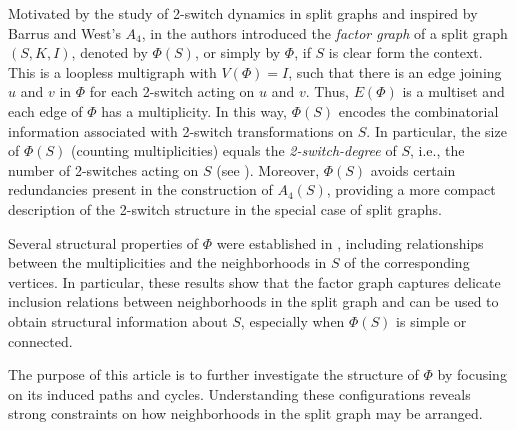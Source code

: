 \documentclass[11pt]{elsarticle}
\begin{document}
Motivated by the study of 2-switch dynamics in split graphs and inspired by Barrus and West's $A_4$, in \cite{pastine2025simple} the authors introduced the \emph{factor graph} of a split graph $(S,K,I)$, denoted by $\Phi(S)$, or simply by $\Phi$, if $S$ is clear form the context. This is a loopless multigraph with $V(\Phi)=I$, such that 
there is an edge joining $u$ and $v$ in $\Phi$ for each 2-switch acting on $u$ and $v$. Thus, $E(\Phi)$ is a multiset and each edge of $\Phi$ has a multiplicity. 
In this way, $\Phi(S)$ encodes the combinatorial information associated with 2-switch transformations on $S$. In particular, the size of $\Phi(S)$ (counting multiplicities) equals the \textit{2-switch-degree} of $S$, i.e., the number of 2-switches acting on $S$ (see \cite{pastine20252}). Moreover, $\Phi(S)$ avoids certain redundancies present in the construction of $A_4(S)$, providing a more compact description of the 2-switch structure in the special case of split graphs.   

Several structural properties of $\Phi$ were established in \cite{pastine2025simple}, including relationships between the multiplicities and the neighborhoods in $S$ of the corresponding vertices. In particular, these results show that the factor graph captures delicate inclusion relations between neighborhoods in the split graph and can be used to obtain structural information about $S$, especially when $\Phi(S)$ is simple or connected.

The purpose of this article is to further investigate the structure of $\Phi$ by focusing on its induced paths and cycles. Understanding these configurations reveals strong constraints on how
neighborhoods in the split graph may be arranged. 
\end{document}
